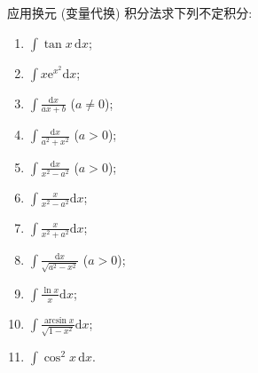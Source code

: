 \begin{example}\label{ex:5.2.1}
应用换元 (变量代换) 积分法求下列不定积分:
\begin{enumerate}[label=(\arabic*)]
  \item $\int\tan x\,\mathrm{d}x$;
  \item $\int x\mathrm{e}^{x^{2}}\mathrm{d}x$;
  \item $\int\frac{\mathrm{d}x}{ax+b}$ ($a\neq 0$);
  \item $\int\frac{\mathrm{d}x}{a^{2}+x^{2}}$ ($a>0$);
  \item $\int\frac{\mathrm{d}x}{x^{2}-a^{2}}$ ($a>0$);
  \item $\int\frac{x}{x^{2}-a^{2}}\mathrm{d}x$;
  \item $\int\frac{x}{x^{2}+a^{2}}\mathrm{d}x$;
  \item $\int\frac{\mathrm{d}x}{\sqrt{a^{2}-x^{2}}}$ ($a>0$);
  \item $\int\frac{\ln x}{x}\mathrm{d}x$;
  \item $\int\frac{\arcsin x}{\sqrt{1-x^{2}}}\mathrm{d}x$;
  \item $\int\cos^{2}x\,\mathrm{d}x$.
\end{enumerate}
\end{example}

